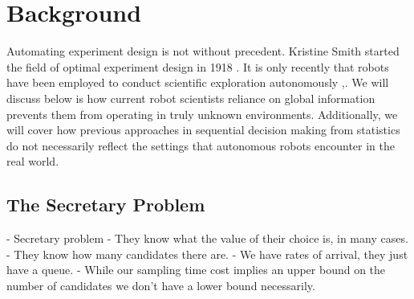 \section{Background}
\label{sec:background}

Automating experiment design is not without precedent.  Kristine Smith started the field of optimal experiment design in 1918 \cite{smith1918standard}.
It is only recently that robots have been employed to conduct scientific exploration autonomously \cite{wagner2001science},\cite{king2004functional}.  We will discuss below is how current robot scientists reliance on global information prevents them from operating in truly unknown environments.  Additionally, we will cover how previous approaches in sequential decision making from statistics do not necessarily reflect the settings that autonomous robots encounter in the real world.


% 
% 
% 
% 
% 
% 

\subsection{The Secretary Problem}

		- Secretary problem
			- They know what the value of their choice is, in many cases.
			- They know how many candidates there are.
			- We have rates of arrival, they just have a queue.
			- While our sampling time cost implies an upper bound on the number of 
			candidates we don't have a lower bound necessarily.

